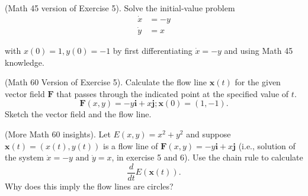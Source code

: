\documentclass[11pt,letterpaper,boxed]{pset}
\begin{document}
    \begin{problem} [Exercise 6.]
    (Math 45 version of Exercise 5). Solve the initial-value problem
    \begin{align}
        \dot{x} &= -y \\
        \dot{y} &= x 
    \end{align}
    
    with $x(0)=1, y(0)=-1$ by first differentiating $\dot{x} = -y$ and using Math 45 knowledge. 
    \end{problem}
    \newpage
    
    
    
    \begin{problem} [Exercise 7.]
    (Math 60 Version of Exercise 5). Calculate the flow line $\mathbf{x}(t)$ for the given vector field $\mathbf{F}$ that passes through the indicated point at the specified value of $t$. 
    \[ \mathbf{F}(x,y)=-y \mathbf{i} + x \mathbf{j}; \mathbf{x}(0)=(1,-1).   \]
    Sketch the vector field and the flow line.
    \end{problem}
    \newpage
    
    
    \begin{problem} [Exercise 8.]
    (More Math 60 insights). Let $E(x,y) = x^2 + y^2$ and suppose $\mathbf{x}(t) = (x(t),y(t))$ is a flow line of  $\mathbf{F}(x,y)=-y \mathbf{i} + x \mathbf{j} $ (i.e., solution of the system $\dot{x}  =   - y  \textrm{ and } \dot{y} =   x $,  in exercise 5 and 6). Use the chain rule to calculate 
    \[  \frac{d}{dt} E(\mathbf{x}(t)).  \]
    Why does this imply the flow lines are circles? 
    \end{problem}
    \newpage
\end{document}
